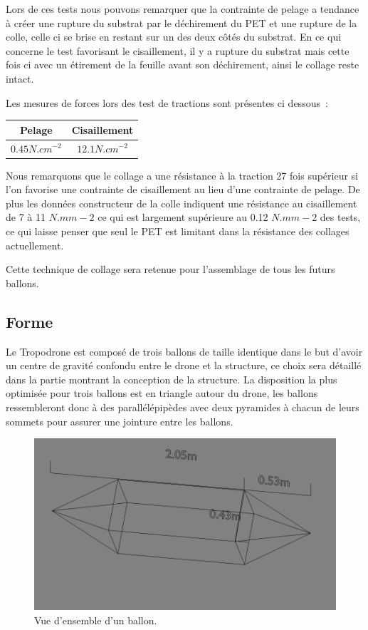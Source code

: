 \documentclass[a4paper,11pt]{article}
\begin{document}
Lors de ces tests nous pouvons remarquer que la contrainte de pelage a tendance à créer une rupture du substrat par le déchirement du PET et une rupture de la colle, celle ci se brise en restant sur un des deux côtés du substrat.
En ce qui concerne le test favorisant le cisaillement, il y a rupture du substrat mais cette fois ci avec un étirement de la feuille avant son déchirement, ainsi le collage reste intact.

Les mesures de forces lors des test de tractions sont présentes ci dessous~:

\begin{center}
  \begin{tabular}{|c|c|}
    \hline
    Pelage & Cisaillement \\
    \hline
    $0.45 N.cm^{-2}$ & $12.1 N.cm^{-2}$ \\
    \hline
  \end{tabular}
\end{center}

Nous remarquons que le collage a une résistance à la traction 27 fois supérieur si l'on favorise une contrainte de cisaillement au lieu d'une contrainte de pelage.
De plus les données constructeur de la colle indiquent une résistance au cisaillement de 7 à 11 $N.mm-2$ ce qui est largement supérieure au 0.12 $N.mm-2$ des tests, ce qui laisse penser que seul le PET est limitant dans la résistance des collages actuellement.


Cette technique de collage sera retenue pour l'assemblage de tous les futurs ballons.

\subsection{Forme}

Le Tropodrone est composé de trois ballons de taille identique dans le but d'avoir un centre de gravité confondu entre le drone et la structure, ce choix sera détaillé dans la partie montrant la conception de la structure.
La disposition la plus optimisée pour trois ballons est en triangle autour du drone, les ballons ressembleront donc à des parallélépipèdes avec deux pyramides à chacun de leurs sommets pour assurer une jointure entre les ballons.

\begin{figure}[H]
	\centering
 \includegraphics[width=12cm]{../Images/ballon.png}
 \caption{Vue d'ensemble d'un ballon.}
\end{figure}
\end{document}
